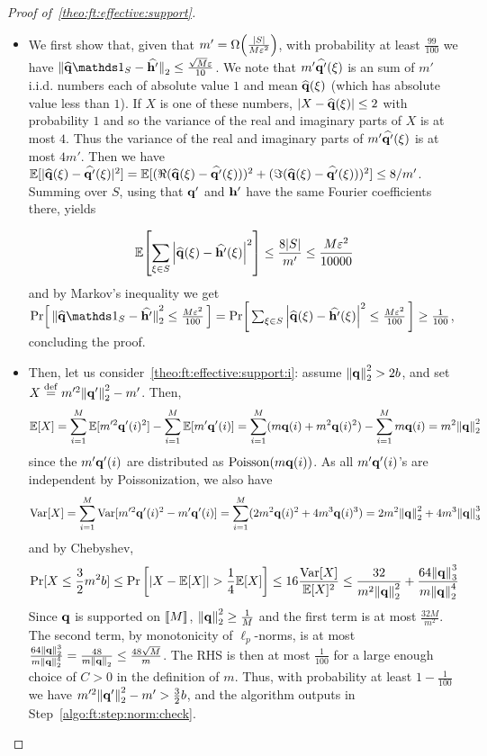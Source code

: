 \begin{proof}[Proof of~\cref{theo:ft:effective:support}]
\begin{itemize}
  \item We first show that, given that $m'=\bigOmega{\frac{\abs{S}}{M\eps^2}}$, with probability at least $\frac{99}{100}$ we have
    $
        \normtwo{\fourier{\q}\indicSet{S}-\fourier{\h'}} \leq \frac{\sqrt{M}\eps}{10}
    $.
	We note that $m'\widehat{\mathbf{q}'}(\xi)$ is an sum of $m'$ i.i.d. numbers each of absolute value $1$ and mean $\widehat{\mathbf{q}}(\xi)$ (which has absolute value less than $1$). If $X$ is one of these numbers, $|X-\widehat{\mathbf{q}}(\xi)| \leq 2$ with probability $1$ and so the variance of the real and imaginary parts of $X$ is at most $4$. Thus the variance of the real and imaginary  parts of $m'\widehat{\mathbf{q}'}(\xi)$ is at most $4m'$. Then we have
	$\mathbb{E}[|\widehat{\mathbf{q}}(\xi) - \widehat{\mathbf{q}'}(\xi)|^2]=\mathbb{E}[ (\Re (\widehat{\mathbf{q}}(\xi) - \widehat{\mathbf{q}'}(\xi)))^2 + (\Im ( \widehat{\mathbf{q}}(\xi) - \widehat{\mathbf{q}'}(\xi)))^2] \leq 8/m'$. Summing over $S$, using that $\mathbf{q}'$ and $\mathbf{h}'$ have the same Fourier coefficients there, yields
	
\[
    \mathbb{E}\!\left[ \sum_{\xi\in S} \left\lvert \widehat{\mathbf{q}}(\xi)-\widehat{\mathbf{h}'}(\xi) \right\rvert^2 \right] \leq \frac{8|S|}{m'} \leq \frac{M\varepsilon^2}{10000}
\]
and by Markov's inequality we get 
$\probaOf{ \normtwo{\fourier{\q}\indicSet{S}-\fourier{\h'}}^2 \leq \frac{M\eps^2}{100} } = \probaOf{ \sum_{\xi\in S} \abs{\fourier{\q}(\xi)-\fourier{\h'}(\xi)}^2 \leq \frac{M\eps^2}{100} } \geq \frac{1}{100}$,
 concluding the proof.


  \item Then, let us consider~\cref{theo:ft:effective:support:i}: assume ${\lVert\mathbf{q}{\rVert}}_2^2 > 2b$, and set $X\stackrel{\rm def}{=} m'^2{\lVert\mathbf{q}'{\rVert}}_2^2 - m'$. Then, 
\[
  \mathbb{E}[ X ] = \sum_{i=1}^M \mathbb{E}[ m'^2\mathbf{q}'(i)^2 ] - \sum_{i=1}^M \mathbb{E}[ m'\mathbf{q}'(i) ] = \sum_{i=1}^M ( m\mathbf{q}(i)+m^2\mathbf{q}(i)^2) - \sum_{i=1}^M m\mathbf{q}(i)= m^2{\lVert\mathbf{q}{\rVert}}_2^2
\]
since the $m'\mathbf{q}'(i)$ are distributed as $\operatorname{Poisson}\!\left( m\mathbf{q}(i) \right) $. As all $m'\mathbf{q}'(i)$'s are independent by Poissonization, we also have
\[
  \operatorname{Var}[ X ] = \sum_{i=1}^M \operatorname{Var}[ m'^2\mathbf{q}'(i)^2 - m'\mathbf{q}'(i) ] = \sum_{i=1}^M ( 2m^2\mathbf{q}(i)^2 + 4m^3\mathbf{q}(i)^3) 
  = 2m^2 {\lVert\mathbf{q}{\rVert}}_2^2 + 4m^3 \lVert\mathbf{q}{\rVert}_3^3
\]
and by Chebyshev,
\[
    \Pr[ X \leq \frac{3}{2}m^2b] \leq \Pr\left[ \left\lvert  X - \mathbb{E}[ X ]  \right\rvert > \frac{1}{4} \mathbb{E}[ X ] \right]
    \leq 16\frac{\operatorname{Var}[ X ]}{\mathbb{E}[ X ]^2}
    \leq \frac{32}{m^2{\lVert\mathbf{q}{\rVert}}_2^2} + \frac{64 \lVert\mathbf{q}{\rVert}_3^3}{m {\lVert\mathbf{q}{\rVert}}_2^4 }
\]
Since $\mathbf{q}$ is supported on $\llbracket M\rrbracket$, ${\lVert\mathbf{q}{\rVert}}_2^2 \geq \frac{1}{M}$ and the first term is at most $\frac{32M}{m^2}$. The second term, by monotonicity of $\ell_p$-norms, is at most 
$\frac{64 {\lVert\mathbf{q}{\rVert}}_2^3}{m {\lVert\mathbf{q}{\rVert}}_2^4 } = \frac{48}{m {\lVert\mathbf{q}{\rVert}}_2 } \leq \frac{48\sqrt{M}}{m}$. The RHS is then at most $\frac{1}{100}$ for a large enough choice of $C>0$ in the definition of $m$. Thus, with probability at least $1-\frac{1}{100}$ we have $m'^2{\lVert\mathbf{q}'{\rVert}}_2^2 - m' > \frac{3}{2}b$, and the algorithm outputs \reject in Step~\ref{algo:ft:step:norm:check}.


\end{itemize}
\end{proof}
